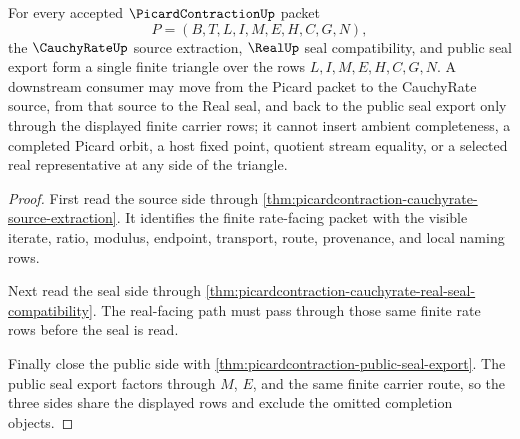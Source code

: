 \begin{theorem}
\label{thm:picardcontraction-finite-rate-seal-triangle}
For every accepted $\PicardContractionUp$ packet
$$
P=(B,T,L,I,M,E,H,C,G,N),
$$
the $\CauchyRateUp$ source extraction, $\RealUp$ seal compatibility, and public seal export form a single finite triangle over the rows $L,I,M,E,H,C,G,N$. A downstream consumer may move from the Picard packet to the CauchyRate source, from that source to the Real seal, and back to the public seal export only through the displayed finite carrier rows; it cannot insert ambient completeness, a completed Picard orbit, a host fixed point, quotient stream equality, or a selected real representative at any side of the triangle.
\end{theorem}
\begin{proof}
First read the source side through \autoref{thm:picardcontraction-cauchyrate-source-extraction}. It identifies the finite rate-facing packet with the visible iterate, ratio, modulus, endpoint, transport, route, provenance, and local naming rows.

Next read the seal side through \autoref{thm:picardcontraction-cauchyrate-real-seal-compatibility}. The real-facing path must pass through those same finite rate rows before the seal is read.

Finally close the public side with \autoref{thm:picardcontraction-public-seal-export}. The public seal export factors through $M$, $E$, and the same finite carrier route, so the three sides share the displayed rows and exclude the omitted completion objects.
\end{proof}

